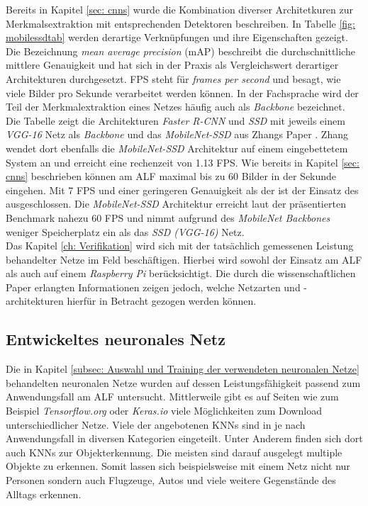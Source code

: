 		Bereits in Kapitel \ref{sec: cnns} wurde die Kombination diverser Architetkuren zur Merkmalsextraktion mit entsprechenden Detektoren beschreiben. In Tabelle \ref{fig: mobilessdtab} werden derartige Verknüpfungen und ihre Eigenschaften gezeigt. Die Bezeichnung \textit{mean average precision} (mAP) beschreibt die durchschnittliche mittlere Genauigkeit und hat sich in der Praxis als Vergleichswert derartiger Architekturen durchgesetzt. FPS steht für \textit{frames per second} und besagt, wie viele Bilder pro Sekunde verarbeitet werden können. In der Fachsprache wird der Teil der Merkmalextraktion eines Netzes häufig auch als \textit{Backbone} bezeichnet. Die Tabelle zeigt die Architekturen \textit{Faster R-CNN} und \textit{SSD} mit jeweils einem \textit{VGG-16} Netz als \textit{Backbone} und das \textit{MobileNet-SSD} aus Zhangs Paper \cite{embedded}. Zhang wendet dort ebenfalls die \textit{MobileNet-SSD} Architektur auf einem eingebettetem System an und erreicht eine rechenzeit von 1.13 FPS. Wie bereits in Kapitel \ref{sec: cnns} beschrieben können am ALF maximal bis zu 60 Bilder in der Sekunde eingehen. Mit 7 FPS und einer geringeren Genauigkeit als der  ist der Einsatz des  ausgeschlossen. Die \textit{MobileNet-SSD} Architektur erreicht laut der präsentierten Benchmark nahezu 60 FPS und nimmt aufgrund des \textit{MobileNet Backbones} weniger Speicherplatz ein als das \textit{SSD (VGG-16)} Netz. \\ 
		
		Das Kapitel \ref{ch: Verifikation} wird sich mit der tatsächlich gemessenen Leistung behandelter Netze im Feld beschäftigen. Hierbei wird sowohl der Einsatz am ALF als auch auf einem \textit{Raspberry Pi} berücksichtigt. Die durch die wissenschaftlichen Paper erlangten Informationen zeigen jedoch, welche Netzarten und -architekturen hierfür in Betracht gezogen werden können.
		
		\subsection{Entwickeltes neuronales Netz}
		\label{seubsec: Entwickeltes neuronales Netz}
		
		Die in Kapitel \ref{subsec: Auswahl und Training der verwendeten neuronalen Netze} behandelten neuronalen Netze wurden auf dessen Leistungsfähigkeit passend zum Anwendungsfall am ALF untersucht. Mittlerweile gibt es auf Seiten wie zum Beispiel \textit{Tensorflow.org} oder \textit{Keras.io} viele Möglichkeiten zum Download unterschiedlicher Netze. Viele der angebotenen KNNs sind in je nach Anwendungsfall in diversen Kategorien eingeteilt. Unter Anderem finden sich dort auch KNNs zur Objekterkennung. Die meisten sind darauf ausgelegt multiple Objekte zu erkennen. Somit lassen sich beispielsweise mit einem Netz nicht nur Personen sondern auch Flugzeuge, Autos und viele weitere Gegenstände des Alltags erkennen. \\ 
		
